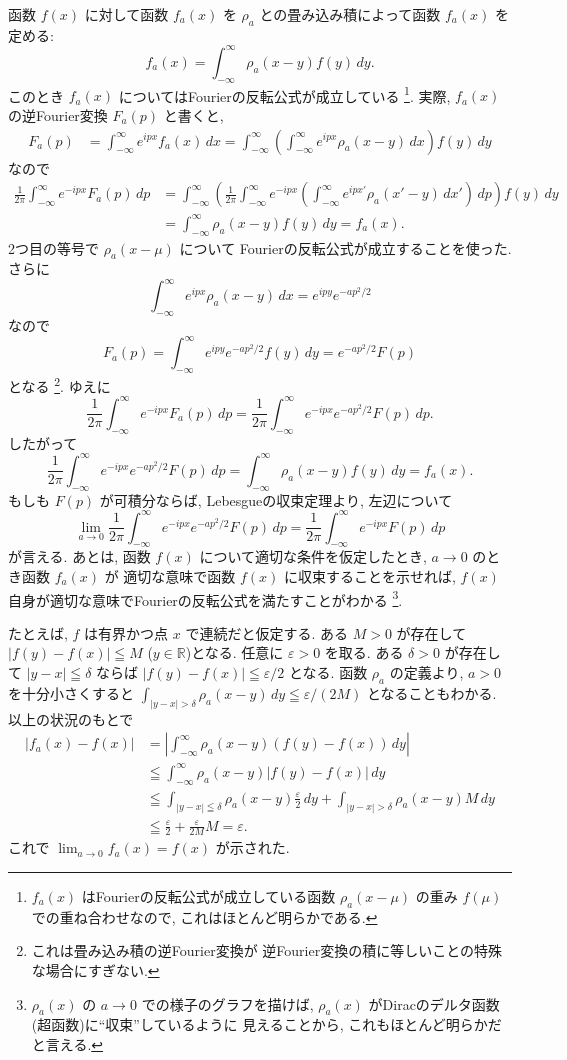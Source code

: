 \documentclass[12pt,twoside]{jarticle}
\newcommand\R{{\mathbb R}} %
\newcommand\eps{\varepsilon}
\theoremstyle{jplain}
\theoremstyle{jplain}
\theoremstyle{jplain}
\numberwithin{theorem}{section}
\numberwithin{equation}{section}
\numberwithin{figure}{section}
\numberwithin{table}{section}
\begin{document}
函数 $f(x)$ に対して函数 $f_a(x)$ を
$\rho_a$ との畳み込み積によって函数 $f_a(x)$ を定める:
\[
f_a(x) = \int_{-\infty}^\infty \rho_a(x-y) f(y)\,dy.
\]
このとき $f_a(x)$ についてはFourierの反転公式が成立している%
\footnote{$f_a(x)$ はFourierの反転公式が成立している函数
$\rho_a(x-\mu)$ の重み $f(\mu)$ での重ね合わせなので,
これはほとんど明らかである.}.
実際, $f_a(x)$ の逆Fourier変換 $F_a(p)$ と書くと,
\begin{align*}
F_a(p)
&= \int_{-\infty}^\infty e^{ipx} f_a(x)\,dx
= \int_{-\infty}^\infty
  \left( \int_{-\infty}^\infty e^{ipx} \rho_a(x-y)\,dx \right)
  f(y)\,dy
\end{align*}
なので
\begin{align*}
\frac{1}{2\pi}\int_{-\infty}^\infty e^{-ipx}F_a(p)\,dp
&=
\int_{-\infty}^\infty
\left(
\frac{1}{2\pi}
\int_{-\infty}^\infty
e^{-ipx}
\left(
\int_{-\infty}^\infty
e^{ipx'}\rho_a(x'-y)\,dx'
\right)
\,dp
\right)
f(y)\,dy
\\ &
=
\int_{-\infty}^\infty \rho_a(x-y) f(y) \,dy
=
f_a(x).
\end{align*}
2つ目の等号で $\rho_a(x-\mu)$ について
Fourierの反転公式が成立することを使った.
さらに
\[
\int_{-\infty}^\infty e^{ipx} \rho_a(x-y)\,dx
=e^{ipy}e^{-ap^2/2}
\]
なので
\[
F_a(p)=\int_{-\infty}^\infty e^{ipy}e^{-ap^2/2}f(y)\,dy=e^{-ap^2/2}F(p)
\]
となる%
\footnote{これは畳み込み積の逆Fourier変換が
逆Fourier変換の積に等しいことの特殊な場合にすぎない.}.
ゆえに
\[
\frac{1}{2\pi}\int_{-\infty}^\infty e^{-ipx}F_a(p)\,dp
=\frac{1}{2\pi}\int_{-\infty}^\infty e^{-ipx}e^{-ap^2/2}F(p)\,dp.
\]
したがって
\[
\frac{1}{2\pi}\int_{-\infty}^\infty e^{-ipx}e^{-ap^2/2}F(p)\,dp
= \int_{-\infty}^\infty \rho_a(x-y)f(y)\,dy
= f_a(x).
\]
もしも $F(p)$ が可積分ならば, Lebesgueの収束定理より, 左辺について
\[
\lim_{a\to 0}\frac{1}{2\pi}\int_{-\infty}^\infty e^{-ipx}e^{-ap^2/2}F(p)\,dp
=\frac{1}{2\pi}\int_{-\infty}^\infty e^{-ipx}F(p)\,dp
\]
が言える.
あとは, 函数 $f(x)$ について適切な条件を仮定したとき,
$a\to 0$ のとき函数 $f_a(x)$ が
適切な意味で函数 $f(x)$ に収束することを示せれば,
$f(x)$ 自身が適切な意味でFourierの反転公式を満たすことがわかる%
\footnote{$\rho_a(x)$ の $a\to 0$ での様子のグラフを描けば,
$\rho_a(x)$ がDiracのデルタ函数(超函数)に``収束''しているように
見えることから, これもほとんど明らかだと言える.}.

たとえば, $f$ は有界かつ点 $x$ で連続だと仮定する.
ある $M>0$ が存在して $|f(y)-f(x)|\leqq M$ ($y\in\R$)となる.
任意に $\eps>0$ を取る.
ある $\delta >0$ が存在して
$|y-x|\leqq\delta$ ならば $|f(y)-f(x)|\leqq\eps/2$ となる.
函数 $\rho_a$ の定義より,
$a>0$ を十分小さくすると $\int_{|y-x|>\delta}\rho_a(x-y)\,dy\leqq\eps/(2M)$
となることもわかる. 以上の状況のもとで
\begin{align*}
|f_a(x)-f(x)|
&=
\left|
\int_{-\infty}^\infty \rho_a(x-y)(f(y)-f(x))\,dy
\right|
\\ &
\leqq
\int_{-\infty}^\infty \rho_a(x-y)|f(y)-f(x)|\,dy
\\ &
\leqq
\int_{|y-x|\leqq\delta} \rho_a(x-y)\frac{\eps}{2}\,dy
+
\int_{|y-x|>\delta} \rho_a(x-y)M\,dy
\\ &
\leqq \frac{\eps}{2}+\frac{\eps}{2M}M
=\eps.
\end{align*}
これで $\lim_{a\to 0}f_a(x)=f(x)$ が示された.
\end{document}
